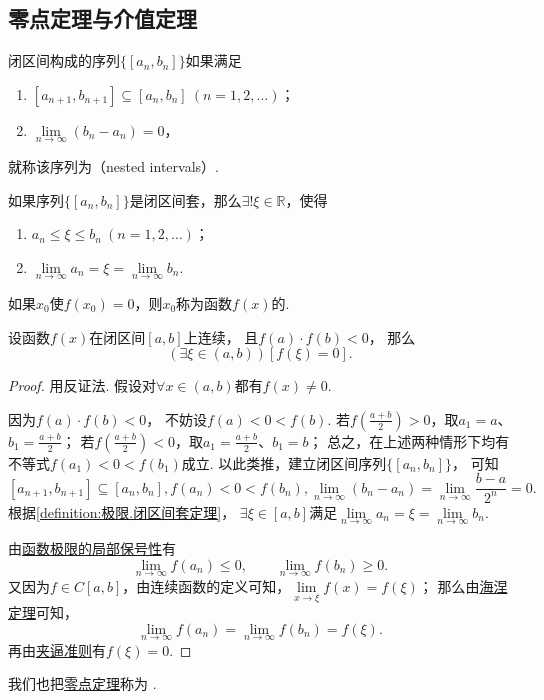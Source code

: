 \subsection{零点定理与介值定理}
\begin{definition}\label{definition:极限.闭区间套的定义}
闭区间构成的序列\(\{[a_n,b_n]\}\)如果满足
\begin{enumerate}
\item \([a_{n+1},b_{n+1}] \subseteq [a_n,b_n]\ (n=1,2,\dotsc)\)；
\item \(\lim\limits_{n\to\infty} (b_n - a_n) = 0\)，
\end{enumerate}
就称该序列为（nested intervals）.
\end{definition}

\begin{theorem}\label{definition:极限.闭区间套定理}
如果序列\(\{[a_n,b_n]\}\)是闭区间套，那么\(\exists!\xi\in\mathbb{R}\)，使得
\begin{enumerate}
\item \(a_n \leq \xi \leq b_n\ (n=1,2,\dotsc)\)；
\item \(\lim\limits_{n\to\infty} a_n
= \xi
= \lim\limits_{n\to\infty} b_n\).
\end{enumerate}
\end{theorem}

\begin{definition}
如果\(x_0\)使\(f(x_0) = 0\)，则\(x_0\)称为函数\(f(x)\)的.
\end{definition}

\begin{theorem}[零点定理]\label{theorem:极限.零点定理}
设函数\(f(x)\)在闭区间\([a,b]\)上连续，
且\(f(a) \cdot f(b)<0\)，
那么\[
	(\exists\xi\in(a,b))[f(\xi) = 0].
\]
\begin{proof}
用反证法.
假设对\(\forall x\in(a,b)\)都有\(f(x) \neq 0\).

因为\(f(a) \cdot f(b)<0\)，
不妨设\(f(a) < 0 < f(b)\).
若\(f\left(\frac{a+b}{2}\right)>0\)，取\(a_1=a\)、\(b_1=\frac{a+b}{2}\)；
若\(f\left(\frac{a+b}{2}\right)<0\)，取\(a_1=\frac{a+b}{2}\)、\(b_1=b\)；
总之，在上述两种情形下均有不等式\(f(a_1) < 0 < f(b_1)\)成立.
以此类推，建立闭区间序列\(\{[a_n,b_n]\}\)，
可知\[
[a_{n+1},b_{n+1}] \subseteq [a_n,b_n],
f(a_n) < 0 < f(b_n),
\lim\limits_{n\to\infty} (b_n - a_n)
= \lim\limits_{n\to\infty} \frac{b-a}{2^n}
= 0.
\]
根据\cref{definition:极限.闭区间套定理}，
\(\exists\xi\in[a,b]\)满足\(\lim\limits_{n\to\infty} a_n
= \xi
= \lim\limits_{n\to\infty} b_n\).

由\hyperref[theorem:极限.函数极限的局部保号性3]{函数极限的局部保号性}有\[
\lim\limits_{n\to\infty} f(a_n) \leq 0,
\qquad
\lim\limits_{n\to\infty} f(b_n) \geq 0.
\]
又因为\(f \in C[a,b]\)，由连续函数的定义可知，\(\lim\limits_{x\to\xi} f(x) = f(\xi)\)；
那么由\hyperref[theorem:极限.海涅定理]{海涅定理}可知，\[
\lim\limits_{n\to\infty} f(a_n)
= \lim\limits_{n\to\infty} f(b_n)
= f(\xi).
\]再由\hyperref[theorem:极限.夹逼准则]{夹逼准则}有\(f(\xi)=0\).
\end{proof}
\end{theorem}
我们也把\hyperref[theorem:极限.零点定理]{零点定理}称为%
.

